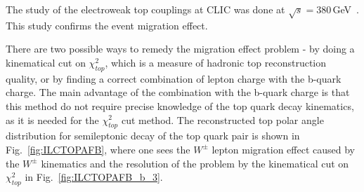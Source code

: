 The study of the electroweak top couplings at CLIC was done at $\sqrt{s} = 380$\,GeV~\cite{bib:Garcia}. This study confirms the event migration effect.


There are two possible ways to remedy the migration effect problem - by doing a kinematical cut on $\chi^2_{top}$, which is a measure of hadronic top reconstruction quality, or by finding a correct combination of lepton charge with the b-quark charge. 
The main advantage of the combination with the b-quark charge is that this method do not require precise knowledge of the top quark decay kinematics, as it is needed for the $\chi^2_{top}$ cut method. 
The reconstructed top polar angle distribution for semileptonic decay of the top quark pair is shown in Fig.~\ref{fig:ILCTOPAFB}, where one sees the $W^\pm$ lepton migration effect caused by the $W^\pm$ kinematics and the resolution of the problem by the kinematical cut on $\chi^2_{top}$ in Fig.~\ref{fig:ILCTOPAFB_b_3}.


